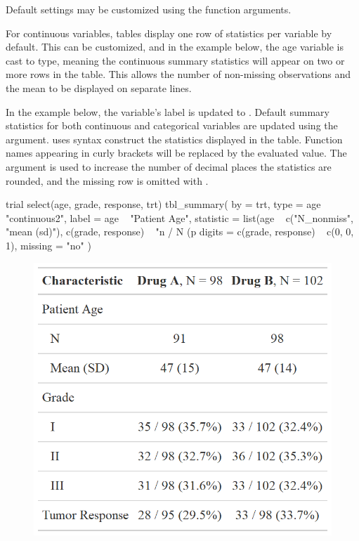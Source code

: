 Default settings may be customized using the  function arguments.



For continuous variables, tables display one row of statistics per variable by default.
This can be customized, and in the example below, the age variable is cast to  type, meaning the continuous summary statistics will appear on two or more rows in the table. 
This allows the number of non-missing observations and the mean to be displayed on separate lines.

In the example below, the  variable's label is updated to .
Default summary statistics for both continuous and categorical variables are updated using the  argument. 
 uses  syntax construct the statistics displayed in the table.
Function names appearing in curly brackets will be replaced by the evaluated value.
The  argument is used to increase the number of decimal places the statistics are rounded, and the missing row is omitted with .

\newpage
\begin{example}
trial %
  select(age, grade, response, trt) %
  tbl_summary(
    by = trt,
    type = age ~ "continuous2",
    label = age ~ "Patient Age",
    statistic = list(age ~ c("{N_nonmiss}", "{mean} ({sd})"),
                     c(grade, response) ~ "{n} / {N} ({p}%
    digits = c(grade, response) ~ c(0, 0, 1),
    missing = "no"
  )
\end{example}
\begin{figure}[h!]
  \includegraphics[scale=0.35]{summary_plus.png}
  \centering
\end{figure}

